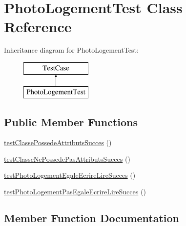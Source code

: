 \hypertarget{class_photo_logement_test}{}\section{Photo\+Logement\+Test Class Reference}
\label{class_photo_logement_test}
Inheritance diagram for Photo\+Logement\+Test\+:\begin{figure}[H]
\begin{center}
\leavevmode
\includegraphics[height=2.000000cm]{class_photo_logement_test}
\end{center}
\end{figure}
\subsection*{Public Member Functions}
\begin{DoxyCompactItemize}
\item 
\hyperlink{class_photo_logement_test_aa656ca72cbbe0f55f6c8154017eb1c23}{test\+Classe\+Possede\+Attributs\+Succes} ()
\item 
\hyperlink{class_photo_logement_test_aee7b86191d86dcb84e7cf351cc898974}{test\+Classe\+Ne\+Possede\+Pas\+Attributs\+Succes} ()
\item 
\hyperlink{class_photo_logement_test_a9b05a602a59081045030b72940e7e7dd}{test\+Photo\+Logement\+Egale\+Ecrire\+Lire\+Succes} ()
\item 
\hyperlink{class_photo_logement_test_a2e88fbdcf8e2720a6c5516b649347099}{test\+Photo\+Logement\+Pas\+Egale\+Ecrire\+Lire\+Succes} ()
\end{DoxyCompactItemize}


\subsection{Member Function Documentation}
\mbox{\label{class_photo_logement_test_aee7b86191d86dcb84e7cf351cc898974}} 
